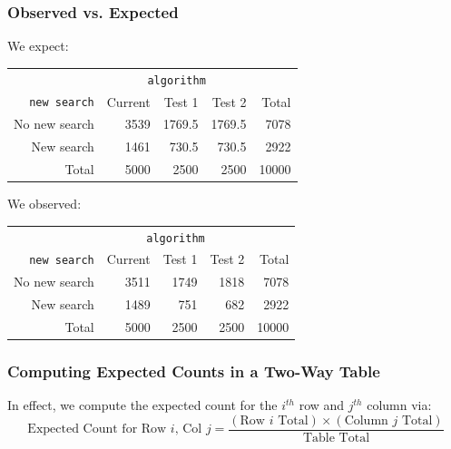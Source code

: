 \documentclass[slides]{beamer}
\newcommand{\blue}[1]{\textcolor{blue2}{#1}}
\begin{document}
\begin{frame}
\frametitle{Observed vs. Expected}

We \blue{expect}:
\begin{center}
  \begin{tabular}{r|rrr|r}
& \multicolumn{3}{c|}{{\tt algorithm}} & \\
       {\tt new search} & Current & Test 1 & Test 2 & Total \\ 
\hline
    No new search & 3539 & 1769.5 & 1769.5 & 7078 \\ 
    New search & 1461 & 730.5 & 730.5 & 2922 \\ 
\hline
    Total & 5000 & 2500 & 2500 & 10000 \\ 
  \end{tabular}
\end{center}
    
\pause We \blue{observed}:
\begin{center}
  \begin{tabular}{r|rrr|r}
& \multicolumn{3}{c|}{{\tt algorithm}} & \\
       {\tt new search} & Current & Test 1 & Test 2 & Total \\ 
\hline
    No new search & 3511 & 1749 & 1818 & 7078 \\ 
    New search & 1489 & 751 & 682 & 2922 \\ 
\hline
    Total & 5000 & 2500 & 2500 & 10000 \\ 
  \end{tabular}
\end{center}

\end{frame}


\begin{frame}
\frametitle{Computing Expected Counts in a Two-Way Table}


In effect, we compute the expected count for the $i^{th}$ row and $j^{th}$ column via:
\[
\mbox{Expected Count for Row $i$, Col $j$} = 
\frac{(\mbox{Row $i$ Total})\times(\mbox{Column $j$ Total})}{\mbox{Table Total}}
\]


\end{frame}
\end{document}
